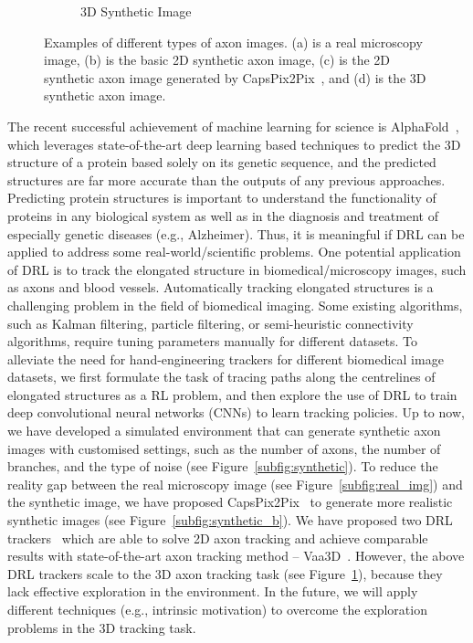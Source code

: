 \begin{figure}[h]
\begin{subfigure}[t]{0.24\textwidth}
    \caption{3D Synthetic Image}
    \label{subfig:3d_synthetic}
  \end{subfigure}\hfill
  \caption{Examples of different types of axon images. (a) is a real microscopy image, (b) is the basic 2D synthetic axon image, (c) is the 2D synthetic axon image generated by CapsPix2Pix~\cite{bass2018image}, and (d) is the 3D synthetic axon image.} 
  \label{fig:axon_env}
\end{figure}
The recent successful achievement of machine learning for science is AlphaFold~\cite{jumper2021highly}, which leverages state-of-the-art deep learning based techniques to predict the 3D structure of a protein based solely on its genetic sequence, and the predicted structures are far more accurate than the outputs of any previous approaches. Predicting protein structures is important to understand the functionality of proteins in any biological system as well as in the diagnosis and treatment of especially genetic diseases (e.g., Alzheimer). Thus, it is meaningful if DRL can be applied to address some real-world/scientific problems. One potential application of DRL is to track the elongated structure in biomedical/microscopy images, such as axons and blood vessels. Automatically tracking elongated structures is a challenging problem in the field of biomedical imaging.  Some existing algorithms, such as Kalman filtering, particle filtering, or semi-heuristic connectivity algorithms, require tuning parameters manually for different datasets. To alleviate the need for hand-engineering trackers for different biomedical image datasets, we
first formulate the task of tracing paths along the centrelines of elongated structures as a RL problem, and then explore the use of DRL to train deep convolutional neural networks (CNNs) to learn tracking policies. Up to now, we have developed a simulated environment that can generate synthetic axon images with customised settings, such as the number of axons, the number of branches, and the type of noise (see Figure~\ref{subfig:synthetic}). To reduce the reality gap between the real microscopy image (see Figure~\ref{subfig:real_img}) and the synthetic image, we have proposed CapsPix2Pix~\cite{bass2018image} to generate more realistic synthetic images (see Figure~\ref{subfig:synthetic_b}). We have proposed two DRL trackers~\cite{dai2019deep,balaram2019maximum} which are able to solve 2D axon tracking and achieve comparable results with state-of-the-art axon tracking method -- Vaa3D~\cite{peng2010v3d}. However, the above DRL trackers  scale to the 3D axon tracking task (see Figure~\ref{subfig:3d_synthetic}), because they lack effective exploration in the environment. In the future, we will apply different techniques (e.g., intrinsic motivation) to overcome the exploration problems in the 3D tracking task.

